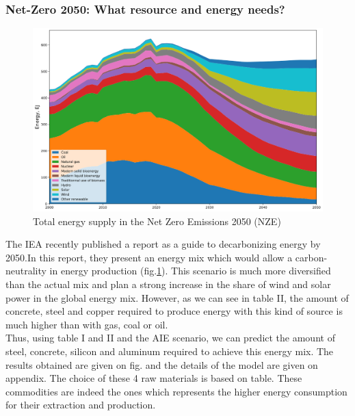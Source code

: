 \documentclass[conference]{IEEEtran}
\begin{document}
\subsubsection{Net-Zero 2050: What resource and energy needs?}

\begin{figure}
    \centering
    \includegraphics[scale=0.2]{energy-demand-scenario.png}
    \caption{Total energy supply in the Net Zero Emissions 2050 (NZE) \cite{noauthor_net_2021} }
    \label{netzero}
\end{figure}
The IEA recently published a report as a guide to decarbonizing energy by 2050.In this report, they present an energy mix which would allow a carbon-neutrality in energy production (fig.\ref{netzero})\cite{noauthor_net_2021}. This scenario is much more diversified than the actual mix and plan a strong increase in the share of wind and solar power in the global energy mix. However, as we can see in table II, the amount of concrete, steel and copper required to produce energy with this kind of source is much higher than with gas, coal or oil. \\
Thus, using table I and II and the AIE scenario, we can predict the amount of steel, concrete, silicon and aluminum required to achieve this energy mix. The results obtained are given on fig. and the details of the model are given on appendix. The choice of these 4 raw materials is based on table. These commodities are indeed the ones which represents the higher energy consumption for their extraction and production.\\
\end{document}
